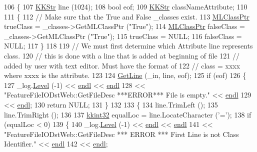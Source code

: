 \begin{DoxyCode}
106 \{
107   \hyperlink{class_k_k_b_1_1_k_k_str}{KKStr}  line (1024);
108   \textcolor{keywordtype}{bool}   eof;
109   \hyperlink{class_k_k_b_1_1_k_k_str}{KKStr}  classNameAttribute;
110 
111   \{
112     \textcolor{comment}{// Make sure that the True and False \_classes exist.}
113     \hyperlink{class_k_k_m_l_l_1_1_m_l_class}{MLClassPtr}  trueClass  = \_classes->GetMLClassPtr (\textcolor{stringliteral}{"True"});
114     \hyperlink{class_k_k_m_l_l_1_1_m_l_class}{MLClassPtr}  falseClass = \_classes->GetMLClassPtr (\textcolor{stringliteral}{"True"});
115     trueClass  = NULL;
116     falseClass = NULL;
117   \}
118 
119   \textcolor{comment}{// We must first determine which Attribute line represents class.}
120   \textcolor{comment}{// this is done with a line that is added at beginning of file }
121   \textcolor{comment}{// added by user with text editor.  Must have the format of }
122   \textcolor{comment}{// class = xxxx  where xxxx is the attribute.}
123 
124   \hyperlink{class_k_k_m_l_l_1_1_feature_file_i_o_a61ca11485d2c14368c1019bfcc53ab16}{GetLine} (\_in, line, eof);
125   \textcolor{keywordflow}{if}  (eof)
126   \{
127     \_log.\hyperlink{class_k_k_b_1_1_run_log_a32cf761d7f2e747465fd80533fdbb659}{Level} (-1) << \hyperlink{namespace_k_k_b_ad1f50f65af6adc8fa9e6f62d007818a8}{endl} << \hyperlink{namespace_k_k_b_ad1f50f65af6adc8fa9e6f62d007818a8}{endl} 
128                     << \textcolor{stringliteral}{"FeatureFileIODstWeb::GetFileDesc      ***ERROR***      File is empty."} << 
      \hyperlink{namespace_k_k_b_ad1f50f65af6adc8fa9e6f62d007818a8}{endl}
129                     << \hyperlink{namespace_k_k_b_ad1f50f65af6adc8fa9e6f62d007818a8}{endl};
130     \textcolor{keywordflow}{return}  NULL;
131   \}
132 
133   \{
134     line.TrimLeft ();
135     line.TrimRight ();
136 
137     \hyperlink{namespace_k_k_b_a8fa4952cc84fda1de4bec1fbdd8d5b1b}{kkint32}  equalLoc = line.LocateCharacter (\textcolor{charliteral}{'='});
138     \textcolor{keywordflow}{if}  (equalLoc < 0)
139     \{
140       \_log.\hyperlink{class_k_k_b_1_1_run_log_a32cf761d7f2e747465fd80533fdbb659}{Level} (-1) << \hyperlink{namespace_k_k_b_ad1f50f65af6adc8fa9e6f62d007818a8}{endl} << \hyperlink{namespace_k_k_b_ad1f50f65af6adc8fa9e6f62d007818a8}{endl}
141                       << \textcolor{stringliteral}{"FeatureFileIODstWeb::GetFileDesc     *** ERROR ***   First Line is not Class
       Identifier."} << \hyperlink{namespace_k_k_b_ad1f50f65af6adc8fa9e6f62d007818a8}{endl}
142                       << \hyperlink{namespace_k_k_b_ad1f50f65af6adc8fa9e6f62d007818a8}{endl};

\end{DoxyCode}
